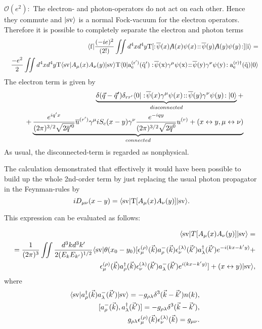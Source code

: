 ${\mathcal O}(e^2):$ The electron- and photon-operators do not act on each
other. Hence they commute and $\vert{\rm sv}\rangle$ is a normal Fock-vacuum
for the electron operators. Therefore it is possible to completely separate the electron
and photon terms
 \begin{eqnarray*}
 &&\langle {\rm f} \vert {(-ie)^2\over(2!)} \int \!\!\! \int d^4xd^4y {\rm T}
 [:\!\overline\psi(x)\rlap{/}A(x)\psi(x)\!::\!\overline\psi(y)\rlap{/}A(y)\psi(y)\!:]
 \vert {\rm i} \rangle =\\
&&{-e^2\over 2} \int \!\!\! \int d^4xd^4y{\rm T}\langle{\rm sv}
 \vert A_{\mu}(x)A_{\nu}(y)\vert {\rm sv}\rangle{\rm T}\langle\rm{0}
 \vert a_{e}^{(r')}(\vec q'):\!\overline \psi(x)\gamma^{\mu} \psi(x)\!::\!\overline
 \psi(y)\gamma^{\nu} \psi(y)\!:a_{e}^{(r)\dagger}(\vec q)\vert{\rm 0}\rangle
 \end{eqnarray*}
The electron term is given by
 \begin{eqnarray*}
 &&\underbrace{\delta(\vec q - \vec q')\delta_{rr'}\langle{\rm 0}\vert:\!
 \overline \psi(x)\gamma^{\mu} \psi(x)\!::\!\overline \psi(y)\gamma^{\nu}
 \psi(y)\!:\vert{\rm 0}\rangle}_{disconnected} + \\
&&+
 \underbrace{{e^{iq'x}\over(2\pi)^{3/2}\sqrt{2\overline q'^{0}}}\overline
 u^{(r')}\gamma^{\mu}iS_{c}(x-y)\gamma^{\nu}{e^{-iqy}\over(2\pi)^{3/2}
 \sqrt{2\overline q^{0}}} u^{(r)} +(x\leftrightarrow y,\mu
 \leftrightarrow \nu)}_{connected}
 \end{eqnarray*}
As usual, the disconnected-term is regarded as nonphysical.

The calculation
demonstrated that effectively it would have been possible to build up the whole 2nd-order term
 by just replacing the usual photon propagator in the Feynman-rules by
$$iD_{\mu\nu}(x-y)=\langle{\rm sv}\vert{\rm T}[A_{\mu}(x)A_{\nu}(y)]
\vert{\rm sv}\rangle.$$

This expression can be evaluated as follows:

\begin{eqnarray*}
&& \langle {\rm sv}\vert T[A_\mu (x)A_\nu (y)]\vert {\rm sv}\rangle= \\
&&={1\over (2\pi)^3} \int \!\!\!\int {d^3kd^3k'\over2(E_k E_{k'})^{1/2}}
 \langle{\rm sv}\vert \theta(x_0 - y_0)[\epsilon^{(\rho)}_{\mu}(\vec k)
 a^{-}_{\rho}(\vec k)\epsilon^{(\lambda)}_{\nu}(\vec k')a^{\dagger}_{\lambda}
 (\vec k')e^{-i(kx-k'y)} + \\
 &&\epsilon^{(\rho)}_{\mu}(\vec k)a^{\dagger}_{\rho}(\vec k)
 \epsilon^{(\lambda)}_{\nu}(\vec k')a^{-}_{\lambda}
 (\vec k')e^{i(kx-k'y)}] + (x \leftrightarrow y)\vert {\rm sv}\rangle ,
\end{eqnarray*}
 where
  \begin{eqnarray*}
&& \langle {\rm sv}\vert a^{\dagger }_{\rho }(\vec k)a^{-}_{\lambda }(\vec k')\vert {\rm sv }\rangle
=
-g_{\rho \lambda }\delta^3(\vec k-\vec k')n(k),\\
&&[ a^{-}_{\rho }({\vec k}) , a ^ {\dagger } _ {\lambda }({\vec k}')]
  =
-g_{\rho \lambda }\delta^3(\vec k-\vec k'),\\
 &&g_{\rho \lambda }\epsilon^{(\rho )}_{\mu}(\vec k)\epsilon^{(\lambda )}_{\nu }(\vec k)  =  g_{\mu \nu}.
\end{eqnarray*}

